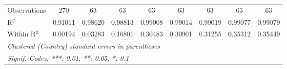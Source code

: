 \begin{table}[htbp]
\begin{tabular}{lcccccccc}
      Observations                                                            & 270      & 63       & 63             & 63              & 63              & 63              & 63              & 63\\  
      R$^2$                                                                   & 0.91011  & 0.98620  & 0.98813        & 0.99008         & 0.99014         & 0.99019         & 0.99077         & 0.99079\\  
      Within R$^2$                                                            & 0.00194  & 0.03283  & 0.16801        & 0.30483         & 0.30901         & 0.31255         & 0.35312         & 0.35449\\  
      \midrule \midrule
      \multicolumn{9}{l}{\emph{Clustered (Country) standard-errors in parentheses}}\\
      \multicolumn{9}{l}{\emph{Signif. Codes: ***: 0.01, **: 0.05, *: 0.1}}\\
   \end{tabular}
\end{table}


